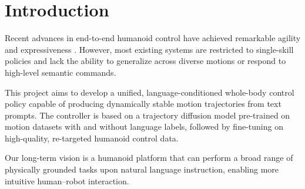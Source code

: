 \section{Introduction}
Recent advances in end-to-end humanoid control have achieved remarkable agility and expressiveness 
\cite{liao2025beyondmimicmotiontrackingversatile, ji2024exbody2, cheng2024express, zhang2025falcon, li2025amo}.
However, most existing systems are restricted to single-skill policies and lack the ability to generalize across diverse motions or respond to high-level semantic commands.

This project aims to develop a unified, language-conditioned whole-body control policy capable of producing dynamically stable motion trajectories from text prompts. 
The controller is based on a trajectory diffusion model pre-trained on motion datasets with and without language labels, followed by fine-tuning on high-quality, re-targeted humanoid control data.

Our long-term vision is a humanoid platform that can perform a broad range of physically grounded tasks upon natural language instruction, enabling more intuitive human–robot interaction.